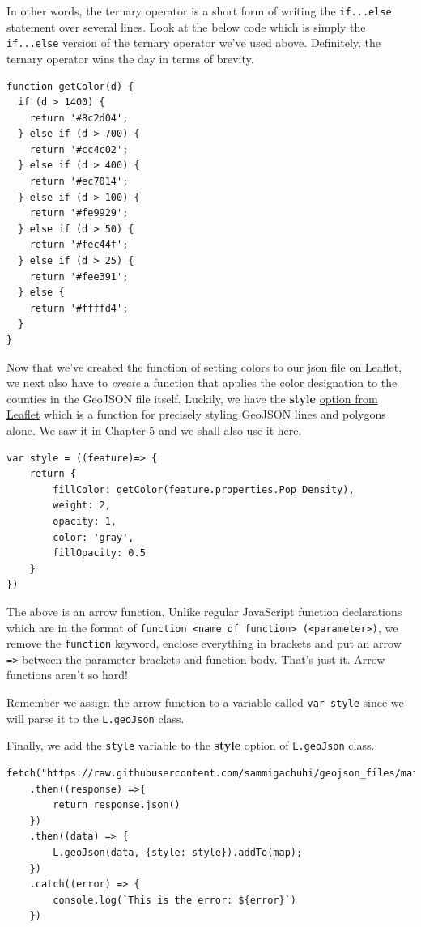 \documentclass[
]{book}
\begin{document}
In other words, the ternary operator is a short form of writing the \texttt{if...else} statement over several lines. Look at the below code which is simply the \texttt{if...else} version of the ternary operator we've used above. Definitely, the ternary operator wins the day in terms of brevity.

\begin{verbatim}
function getColor(d) {
  if (d > 1400) {
    return '#8c2d04';
  } else if (d > 700) {
    return '#cc4c02';
  } else if (d > 400) {
    return '#ec7014';
  } else if (d > 100) {
    return '#fe9929';
  } else if (d > 50) {
    return '#fec44f';
  } else if (d > 25) {
    return '#fee391';
  } else {
    return '#ffffd4';
  }
}
\end{verbatim}

Now that we've created the function of setting colors to our json file on Leaflet, we next also have to \emph{create} a function that applies the color designation to the counties in the GeoJSON file itself. Luckily, we have the \textbf{style} \href{https://leafletjs.com/reference.html\#geojson-style}{option from Leaflet} which is a function for precisely styling GeoJSON lines and polygons alone. We saw it in \protect\hyperlink{using-geojson-in-leaflet}{Chapter 5} and we shall also use it here.

\begin{verbatim}
var style = ((feature)=> {
    return {
        fillColor: getColor(feature.properties.Pop_Density),
        weight: 2,
        opacity: 1,
        color: 'gray',
        fillOpacity: 0.5
    }
})
\end{verbatim}

The above is an arrow function. Unlike regular JavaScript function declarations which are in the format of \texttt{function\ \textless{}name\ of\ function\textgreater{}\ (\textless{}parameter\textgreater{})}, we remove the \texttt{function} keyword, enclose everything in brackets and put an arrow \texttt{=\textgreater{}} between the parameter brackets and function body. That's just it. Arrow functions aren't so hard!

Remember we assign the arrow function to a variable called \texttt{var\ style} since we will parse it to the \texttt{L.geoJson} class.

Finally, we add the \texttt{style} variable to the \textbf{style} option of \texttt{L.geoJson} class.

\begin{verbatim}
fetch("https://raw.githubusercontent.com/sammigachuhi/geojson_files/main/counties_json.json")
    .then((response) =>{
        return response.json()
    })
    .then((data) => {
        L.geoJson(data, {style: style}).addTo(map);
    })
    .catch((error) => {
        console.log(`This is the error: ${error}`)
    })
    
\end{verbatim}
\end{document}
